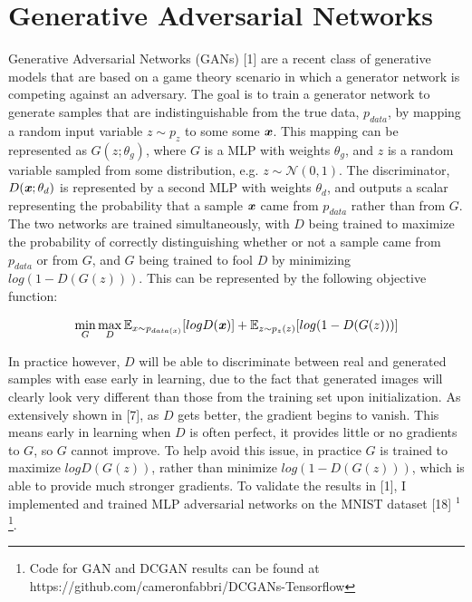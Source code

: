 \documentclass[9pt]{article}
\begin{document}
\section{Generative Adversarial Networks}
\noindent Generative Adversarial Networks (GANs) [1] are a recent class of generative models that are based on a game theory scenario in which a generator
network is competing against an adversary. The goal is to train a generator network to generate samples that are indistinguishable from the true data, $p_{data}$,
by mapping a random input variable $z \sim p_z$ to some some $\textbf{\textit{x}}$. This mapping can be represented as $G(z;\theta_g)$, where $G$ is a MLP with weights $\theta_g$, and $z$ is a random
variable sampled from some distribution, e.g. $z \sim \mathcal{N}(0,1)$. The discriminator, $D(\textbf{\textit{x}}; \theta_d)$ is represented by a second MLP with weights
$\theta_d$, and outputs a scalar representing the probability that a sample $\textbf{\textit{x}}$ came from $p_{data}$ rather than from $G$. The two networks are trained
simultaneously, with $D$ being trained to maximize the probability of correctly distinguishing whether or not a sample came from $p_{data}$ or from $G$, and $G$ being 
trained to fool $D$ by minimizing $log(1-D(G(z)))$. This can be represented by the following objective function:

\[\min\limits_{G}\max\limits_{D} \mathbb{E}_{x \sim p_{data(x)}} [logD(\textbf{\textit{x}})] + \mathbb{E}_{z \sim p_z(z)}[log(1 - D(G(z)))]\]

\noindent In practice however, $D$ will be able to discriminate between real and generated samples with
ease early in learning, due to the fact that generated images will clearly look very different than those from the training set upon initialization. As extensively shown in [7],
as $D$ gets better, the gradient begins to vanish. This means early in learning when $D$ is often perfect, it provides little or no gradients to $G$, so $G$ cannot improve.
To help avoid this issue, in practice $G$ is trained to maximize $logD(G(z))$, rather than minimize $log(1-D(G(z)))$, which is able to provide much stronger gradients. To validate the
results in [1], I implemented and trained MLP adversarial networks on the MNIST dataset [18] $^1$\footnote{Code for GAN and DCGAN results can be found
at https://github.com/cameronfabbri/DCGANs-Tensorflow}.\newline
\end{document}
